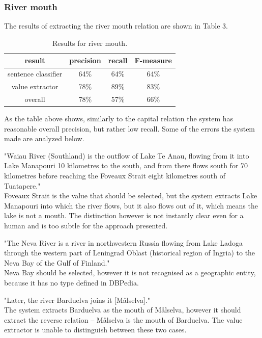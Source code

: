 \documentclass[10pt,a5paper,twoside]{article}
\begin{document}
\subsubsection{River mouth}
The results of extracting the river mouth relation are shown in Table 3.
\begin{table}[!h]
\centering
\begin{tabular}{ | c | c | c | c | }
    \hline
    result & precision & recall & F-measure \\ \hline \hline
    sentence classifier & 64\% & 64\% & 64\% \\ \hline
    value extractor     & 78\% & 89\% & 83\% \\ \hline
    overall             & 78\% & 57\% & 66\% \\ \hline
\end{tabular}
\caption{Results for river mouth.}
\end{table}

As the table above shows, similarly to the capital relation the system has reasonable overall precision, but rather low recall. Some of the errors the system made are analyzed below.
\begin{compactitem}
    \item "Waiau River (Southland) is the outflow of Lake Te Anau, flowing from it into Lake Manapouri 10 kilometres to the south, and from there flows south for 70 kilometres before reaching the Foveaux Strait eight kilometres south of Tuatapere."\\ Foveaux Strait is the value that should be selected, but the system extracts Lake Manapouri into which the river flows, but it also flows out of it, which means the lake is not a mouth. The distinction however is not instantly clear even for a human and is too subtle for the approach presented.
    \item "The Neva River is a river in northwestern Russia flowing from Lake Ladoga through the western part of Leningrad Oblast (historical region of Ingria) to the Neva Bay of the Gulf of Finland."\\ Neva Bay should be selected, however it is not recognised as a geographic entity, because it has no type defined in DBPedia.
    \item "Later, the river Barduelva joins it [Målselva]."\\ The system extracts Barduelva as the mouth of Målselva, however it should extract the reverse relation – Målselva is the mouth of Barduelva. The value extractor is unable to distinguish between these two cases.
\end{compactitem}
\end{document}
